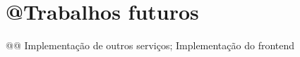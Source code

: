 \chapter{@Trabalhos futuros}\label{trabalhos-futuros}

@@ Implementação de outros serviços; Implementação do frontend
